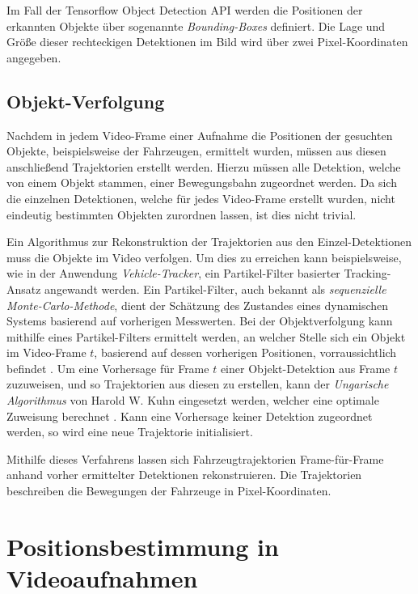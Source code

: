 Im Fall der Tensorflow Object Detection API werden die Positionen der erkannten Objekte über sogenannte
\textit{Bounding-Boxes} definiert. Die Lage und Größe dieser rechteckigen Detektionen im Bild wird über
zwei Pixel-Koordinaten angegeben. \cite[]{Huang2018}

\subsection{Objekt-Verfolgung}

Nachdem in jedem Video-Frame einer Aufnahme die Positionen der gesuchten Objekte, beispielsweise der
Fahrzeugen, ermittelt wurden, müssen aus diesen anschließend Trajektorien erstellt werden.
Hierzu müssen alle Detektion, welche von einem Objekt stammen, einer Bewegungsbahn zugeordnet werden.
Da sich die einzelnen Detektionen, welche für jedes Video-Frame erstellt wurden, nicht eindeutig bestimmten Objekten
zurordnen lassen, ist dies nicht trivial.

Ein Algorithmus zur Rekonstruktion der Trajektorien aus den Einzel-Detektionen muss die Objekte im Video
verfolgen. Um dies zu erreichen kann beispielsweise, wie in der Anwendung \textit{Vehicle-Tracker},
ein Partikel-Filter basierter Tracking-Ansatz angewandt werden.
Ein Partikel-Filter, auch bekannt als \textit{sequenzielle Monte-Carlo-Methode}, dient der Schätzung
des Zustandes eines dynamischen Systems basierend auf vorherigen Messwerten.
Bei der Objektverfolgung kann mithilfe eines Partikel-Filters ermittelt werden, an welcher Stelle sich
ein Objekt im Video-Frame $t$, basierend auf dessen vorherigen Positionen, vorraussichtlich befindet \cite[]{Apeltauer2015}.
Um eine Vorhersage für Frame $t$ einer Objekt-Detektion aus Frame $t$ zuzuweisen, und so Trajektorien aus diesen zu erstellen,
kann der \textit{Ungarische Algorithmus} von Harold W. Kuhn eingesetzt werden, welcher eine optimale
Zuweisung berechnet \cite[]{Szottka2011}. Kann eine Vorhersage keiner Detektion zugeordnet werden,
so wird eine neue Trajektorie initialisiert.

Mithilfe dieses Verfahrens lassen sich Fahrzeugtrajektorien Frame-für-Frame anhand vorher ermittelter
Detektionen rekonstruieren. Die Trajektorien beschreiben die Bewegungen der Fahrzeuge in Pixel-Koordinaten.

\section{Positionsbestimmung in Videoaufnahmen}
\label{sec:grund_mapMatching}

